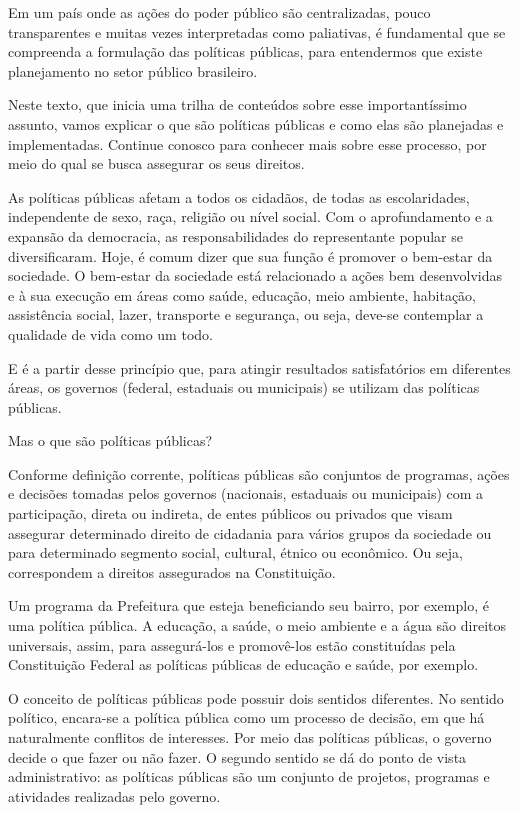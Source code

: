 \documentclass[
   article,       
   12pt,          
   oneside,       
   a4paper,       
   english,       
   brazil,        
   sumario=tradicional
   ]{abntex2}
\begin{document}
Em um país onde as ações do poder público são centralizadas, pouco transparentes e muitas vezes interpretadas como paliativas, é fundamental que se compreenda a formulação das políticas públicas, para entendermos que existe planejamento no setor público brasileiro.

Neste texto, que inicia uma trilha de conteúdos sobre esse importantíssimo assunto, vamos explicar o que são políticas públicas e como elas são planejadas e implementadas. Continue conosco para conhecer mais sobre esse processo, por meio do qual se busca assegurar os seus direitos.

As políticas públicas afetam a todos os cidadãos, de todas as escolaridades, independente de sexo, raça, religião ou nível social. Com o aprofundamento e a expansão da democracia, as responsabilidades do representante popular se diversificaram. Hoje, é comum dizer que sua função é promover o bem-estar da sociedade. O bem-estar da sociedade está relacionado a ações bem desenvolvidas e à sua execução em áreas como saúde, educação, meio ambiente, habitação, assistência social, lazer, transporte e segurança, ou seja, deve-se contemplar a qualidade de vida como um todo.

E é a partir desse princípio que, para atingir resultados satisfatórios em diferentes áreas, os governos (federal, estaduais ou municipais) se utilizam das políticas públicas.

Mas o que são políticas públicas?

Conforme definição corrente, políticas públicas são conjuntos de programas, ações e decisões tomadas pelos governos (nacionais, estaduais ou municipais) com a participação, direta ou indireta, de entes públicos ou privados que visam assegurar determinado direito de cidadania para vários grupos da sociedade ou para determinado segmento social, cultural, étnico ou econômico. Ou seja, correspondem a direitos assegurados na Constituição.

Um programa da Prefeitura que esteja beneficiando seu bairro, por exemplo, é uma política pública. A educação, a saúde, o meio ambiente e a água são direitos universais, assim, para assegurá-los e promovê-los estão constituídas pela Constituição Federal as políticas públicas de educação e saúde, por exemplo.

O conceito de políticas públicas pode possuir dois sentidos diferentes. No sentido político, encara-se a política pública como um processo de decisão, em que há naturalmente conflitos de interesses. Por meio das políticas públicas, o governo decide o que fazer ou não fazer. O segundo sentido se dá do ponto de vista administrativo: as políticas públicas são um conjunto de projetos, programas e atividades realizadas pelo governo.
\end{document}
